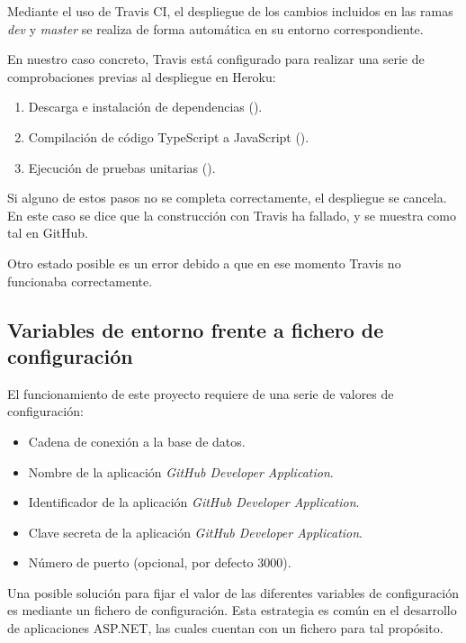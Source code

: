 Mediante el uso de Travis CI, el despliegue de los cambios incluidos en las ramas \emph{dev} y \emph{master} se realiza de forma automática en su entorno correspondiente.


En nuestro caso concreto, Travis está configurado para realizar una serie de comprobaciones previas al despliegue en Heroku:

\begin{enumerate}
	\item Descarga e instalación de dependencias ().
	\item Compilación de código TypeScript a JavaScript ().
	\item Ejecución de pruebas unitarias ().
\end{enumerate}

Si alguno de estos pasos no se completa correctamente, el despliegue se cancela. En este caso se dice que la construcción con Travis ha fallado, y se muestra como tal en GitHub.

Otro estado posible es un error debido a que en ese momento Travis no funcionaba correctamente.


\subsection{Variables de entorno frente a fichero de configuración}

El funcionamiento de este proyecto requiere de una serie de valores de configuración:

\begin{itemize}
	\item Cadena de conexión a la base de datos.
	\item Nombre de la aplicación \emph{GitHub Developer Application}.
	\item Identificador de la aplicación \emph{GitHub Developer Application}.
	\item Clave secreta de la aplicación \emph{GitHub Developer Application}.
	\item Número de puerto (opcional, por defecto 3000).
\end{itemize}

Una posible solución para fijar el valor de las diferentes variables de configuración es mediante un fichero de configuración. Esta estrategia es común en el desarrollo de aplicaciones ASP.NET, las cuales cuentan con un fichero  para tal propósito.

